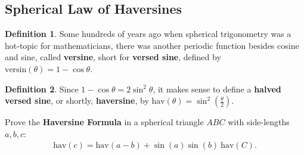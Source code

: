 \documentclass[12pt,a4paper]{memoir}
\theoremstyle{definition}
\newtheorem*{definition}{Definition}
\begin{document}
\subsection{Spherical Law of Haversines}
	\begin{definition}
		Some hundreds of years ago when spherical trigonometry was a hot-topic for mathematicians, there was another periodic function besides cosine and sine, called \textbf{versine}, short for \textbf{versed sine}, defined by $\text{versin}(\theta)=1-\cos \theta$.
	\end{definition}
	\begin{definition}
		Since $1-\cos\theta=2\sin^2\theta$, it makes sense to define a \textbf{halved versed sine}, or shortly, \textbf{haversine}, by $\text{hav}(\theta)=\sin^2\left(\frac{\theta}{2}\right)$.
	\end{definition}
	\begin{question}\label{q:hav}
		Prove the \textbf{Haversine Formula} in a spherical triangle $ABC$ with side-lengths $a,b,c$:
		\begin{align*}
			\text{hav}(c) = \text{hav}(a-b) +\sin(a) \sin(b) \  \text{hav}(C). 
		\end{align*}
	\end{question}
\end{document}
